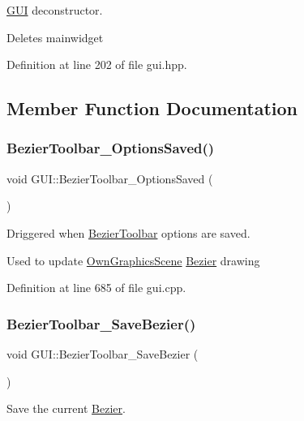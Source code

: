\mbox{\hyperlink{classGUI}{G\+UI}} deconstructor. 

Deletes mainwidget 

Definition at line 202 of file gui.\+hpp.



\subsection{Member Function Documentation}
\mbox{\label{classGUI_a593ffaac7d8a664f20893aed2536988b}} 
\subsubsection{\texorpdfstring{Bezier\+Toolbar\+\_\+\+Options\+Saved()}{BezierToolbar\_OptionsSaved()}}
{\footnotesize\ttfamily void G\+U\+I\+::\+Bezier\+Toolbar\+\_\+\+Options\+Saved (\begin{DoxyParamCaption}{ }\end{DoxyParamCaption})}



Driggered when \mbox{\hyperlink{structBezierToolbar}{Bezier\+Toolbar}} options are saved. 

Used to update \mbox{\hyperlink{classOwnGraphicsScene}{Own\+Graphics\+Scene}} \mbox{\hyperlink{classBezier}{Bezier}} drawing 

Definition at line 685 of file gui.\+cpp.

\mbox{\label{classGUI_a6f27f73cf15f18dfa206630cc77bc7df}} 
\subsubsection{\texorpdfstring{Bezier\+Toolbar\+\_\+\+Save\+Bezier()}{BezierToolbar\_SaveBezier()}}
{\footnotesize\ttfamily void G\+U\+I\+::\+Bezier\+Toolbar\+\_\+\+Save\+Bezier (\begin{DoxyParamCaption}{ }\end{DoxyParamCaption})}



Save the current \mbox{\hyperlink{classBezier}{Bezier}}. 

